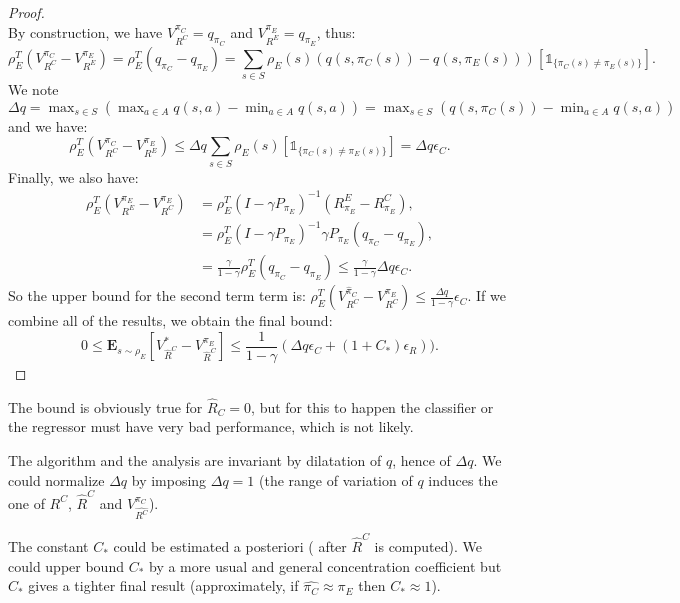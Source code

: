 \documentclass[smallextended]{svjour3}
\newcommand{\E}{\mathbf{E}}
\begin{document}
\begin{proof}
\begin{equation}
\end{equation}
By construction, we have $V^{\pi_C}_{R^C}=q_{\pi_C}$ and $V^{\pi_E}_{R^E}=q_{\pi_E}$, thus:
\begin{equation}
\rho_E^T(V^{\pi_C}_{R^C}-V^{\pi_E}_{R^E})=\rho_E^T(q_{\pi_C}-q_{\pi_E})=\sum_{s\in S}\rho_E(s)(q(s,\pi_C(s))-q(s,\pi_E(s)))[\mathds{1}_{\{\pi_C(s)\neq\pi_E(s)\}}].
\end{equation}
We note $\Delta q=\max_{s\in S}(\max_{a\in A}q(s,a)-\min_{a\in A}q(s,a))=\max_{s\in S}(q(s,\pi_C(s))-\min_{a\in A}q(s,a))$ and we have:
\begin{equation}
\rho_E^T(V^{\pi_C}_{R^C}-V^{\pi_E}_{R^E})\leq\Delta q\sum_{s\in S}\rho_E(s)[\mathds{1}_{\{\pi_C(s)\neq\pi_E(s)\}}]= \Delta q \epsilon_C.
\end{equation}
Finally, we also have:
\begin{align}
\rho_E^T(V^{\pi_E}_{R^E}-V^{\pi_E}_{R^C})&=\rho_E^T(I-\gamma P_{\pi_E})^{-1}(R^E_{\pi_E}-R^C_{\pi_E}),
\\
&=\rho_E^T(I-\gamma P_{\pi_E})^{-1}\gamma P_{\pi_E}(q_{\pi_C}-q_{\pi_E}),
\\
&=\frac{\gamma}{1-\gamma}\rho_E^T(q_{\pi_C}-q_{\pi_E})\leq \frac{\gamma}{1-\gamma}\Delta q \epsilon_C.
\end{align}
So the upper bound for the second term term is: $\rho_E^T(V^{\hat{\pi}_C}_{R^C}-V^{\pi_E}_{R^C})\leq \frac{\Delta q}{1-\gamma}\epsilon_C$.
If we combine all of the results, we obtain the final bound:
\begin{equation}
0\leq\E_{s\sim\rho_E}[V^*_{\hat{R}^C}-V^{\pi_E}_{\hat{R}^C}]\leq \frac{1}{1-\gamma}(\Delta q \epsilon_C+(1+C_*)\epsilon_R)).
\end{equation}
\end{proof}

The bound is obviously true for $\hat{R}_C = 0$, but for this to happen the classifier or the regressor must have very bad performance, which is not likely.

The algorithm and the analysis are invariant by  dilatation of $q$, hence of $\Delta q$. We could normalize $\Delta q$ by imposing $\Delta q=1$ (the range of variation of $q$ induces the one of $R^C$, $\hat{R}^C$ and $V^{\pi_C}_{\hat{R^C}}$).

The constant $C_*$ could be estimated a posteriori ( after $\hat{R}^C$ is computed). We could upper bound $C_*$ by a more usual and general concentration coefficient but $C_*$ gives a tighter final result (approximately, if $\hat{\pi_C}\approx\pi_E$ then $C_* \approx 1$).
\end{document}
